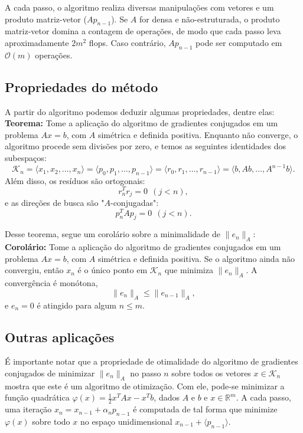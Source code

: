 \documentclass[a4paper,11pt]{article}
\begin{document}
            A cada passo, o algoritmo realiza diversas manipulações com vetores e um produto matriz-vetor ($Ap_{n-1}$). Se $A$ for densa e não-estruturada, o produto matriz-vetor domina a contagem de operações, de modo que cada passo leva aproximadamente $2m^2$ flops. Caso contrário, $Ap_{n-1}$ pode ser computado em $\mathcal{O}(m)$ operações.
        
        \subsection{Propriedades do método}
            A partir do algoritmo podemos deduzir algumas propriedades, dentre elas: \\
            \textbf{Teorema:} Tome a aplicação do algoritmo de gradientes conjugados em um problema $Ax=b$, com $A$ simétrica e definida positiva. Enquanto não converge, o algoritmo procede sem divisões por zero, e temos as seguintes identidades dos subespaços:
            $$
                \mathcal{K}_n = \langle x_1, x_2, \dots, x_n  \rangle = \langle p_0, p_1, \dots, p_{n-1}  \rangle = \langle r_0, r_1, \dots, r_{n-1}  \rangle = \langle b, Ab, \dots, A^{n-1}b  \rangle.
            $$
            Além disso, os resíduos são ortogonais:
            $$
                r^T_nr_j = 0\ \ (j<n),
            $$
            e as direções de busca são "$A$-conjugadas":
            $$
                p^T_nAp_j = 0\ \ (j<n).
            $$
            
            Desse teorema, segue um corolário sobre a minimalidade de $\| e_n \|_A$: \\
            \textbf{Corolário:}  Tome a aplicação do algoritmo de gradientes conjugados em um problema $Ax=b$, com $A$ simétrica e definida positiva. Se o algoritmo ainda não convergiu, então $x_n$ é o único ponto em $\mathcal{K}_n$ que minimiza $\| e_n \|_A$. A convergência é monótona,
            $$
                \| e_n \|_A \leq \| e_{n-1} \|_A,
            $$
            e $e_n = 0$ é atingido para algum $n \leq m$.
        
        \subsection{Outras aplicações}
            É importante notar que a propriedade de otimalidade do algoritmo de gradientes conjugados de minimizar  $\| e_n \|_A$ no passo $n$ sobre todos os vetores $x \in \mathcal{K}_n$ mostra que este é um algoritmo de otimização. Com ele, pode-se minimizar a função quadrática $\varphi(x) =  \frac{1}{2}x^TAx-x^Tb$, dados $A$ e $b$ e $x \in \mathbb{R}^m$. A cada passo, uma iteração $x_n = x_{n-1}+ \alpha_np_{n-1}$ é computada de tal forma que minimize $\varphi(x)$ sobre todo $x$ no espaço unidimensional $x_{n-1}+ \langle p_{n-1} \rangle$.
            
\end{document}
